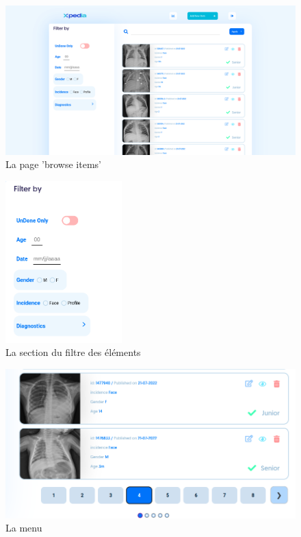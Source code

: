 \documentclass[12pt]{report}
\begin{document}
    \begin{figure}[H]
        \centering
        \includegraphics[width=\textwidth]{xpedia_browse_item.png}
        \caption{La page 'browse items'}\label{fig:xpedia_menu}
    \end{figure}
    \begin{figure}[H]
        \centering
        \includegraphics[width=0.4\textwidth]{xpedia_filter_section.png}
        \caption{La section du filtre des éléments}\label{fig:xpedia_filter_section}
    \end{figure}
    \begin{figure}[H]
        \centering
        \includegraphics[width=\textwidth]{xpedia_pagination.png}
        \caption{La menu}\label{fig:xpedia_menu}
    \end{figure}
    
\end{document}
